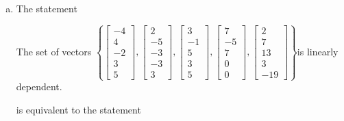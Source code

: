 \begin{exerciseAnswer}
\begin{enumerate}[(a)]
\item The statement 
\begin{center}\begin{minipage}{0.8\textwidth}
 The set of vectors \( \left\{ \left[\begin{array}{c}
-4 \\
4 \\
-2 \\
3 \\
5
\end{array}\right] , \left[\begin{array}{c}
2 \\
-5 \\
-3 \\
-3 \\
3
\end{array}\right] , \left[\begin{array}{c}
3 \\
-1 \\
5 \\
3 \\
5
\end{array}\right] , \left[\begin{array}{c}
7 \\
-5 \\
7 \\
0 \\
0
\end{array}\right] , \left[\begin{array}{c}
2 \\
7 \\
13 \\
3 \\
-19
\end{array}\right] \right\} \)is linearly dependent.
\end{minipage}\end{center}
     is equivalent to the statement 
\begin{center}\begin{minipage}{0.8\textwidth}
 The vector equation \( x_{1} \left[\begin{array}{c}
-4 \\
4 \\
-2 \\
3 \\
5
\end{array}\right] + x_{2} \left[\begin{array}{c}
2 \\
-5 \\

\end{array}
\end{minipage}
\end{center}
\end{enumerate}
\end{exerciseAnswer}
